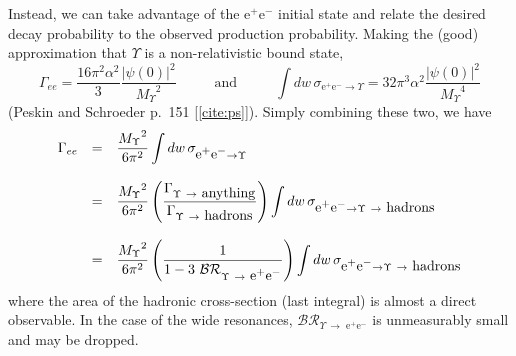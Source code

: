 \documentclass[12pt]{article}
\begin{document}
Instead, we can take advantage of the e$^+$e$^-$ initial state and
relate the desired decay probability to the observed production
probability. Making the (good) approximation that $\Upsilon$ is a
non-relativistic bound state,
\begin{equation}
  \Gamma_{ee} = \frac{16 \pi^2 \alpha^2}{3} \frac{\left|\psi(0)\right|^2}{\mbox{$M_\Upsilon$}^2}
  \hspace{1cm}\mbox{ and }\hspace{1cm}
  \int dw\, \sigma_{\mbox{e$^+$e$^-$} \to \Upsilon} = 32 \pi^3 \alpha^2
  \frac{\left|\psi(0)\right|^2}{\mbox{$M_\Upsilon$}^4}
\end{equation}
(Peskin and Schroeder p.\ 151 [\ref{cite:ps}]). Simply combining these
two, we have
\begin{equation}
  \begin{array}{c c l}
    \Gamma_{ee} &=& \displaystyle \frac{\mbox{$M_\Upsilon$}^2}{6 \pi^2} \int dw\, \sigma_{\mbox{e$^+$e$^-$} \to \Upsilon} \\
                & & \\
                &=& \displaystyle \frac{\mbox{$M_\Upsilon$}^2}{6 \pi^2}
                    \left(\frac{\Gamma_{\Upsilon\ \to \mbox{ anything}}}{\Gamma_{\Upsilon\ \to \mbox{ hadrons}}}\right)
                    \int dw\, \sigma_{\mbox{e$^+$e$^-$} \to \Upsilon\ \to \mbox{ hadrons}} \\
                & & \\
                &=& \displaystyle \frac{\mbox{$M_\Upsilon$}^2}{6 \pi^2}
                    \left(\frac{1}{1 - 3\ \mathcal{BR}_{\Upsilon\ \to \mbox{ e$^+$e$^-$}}}\right)
                    \int dw\, \sigma_{\mbox{e$^+$e$^-$} \to \Upsilon\ \to \mbox{ hadrons}} \\
  \end{array}
\end{equation}
where the area of the hadronic cross-section (last integral) is almost
a direct observable. In the case of the wide resonances,
$\mathcal{BR}_{\Upsilon\ \to \mbox{ e$^+$e$^-$}}$ is unmeasurably
small and may be dropped.
\end{document}
